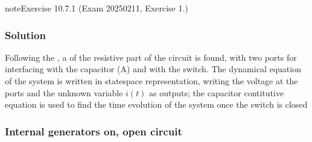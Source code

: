\documentclass[letterpaper,10pt,italian]{jupyterBook}
\begin{document}
\begin{sphinxadmonition}{note}{Exercise 10.7.1 (Exam 2025\sphinxhyphen{}02\sphinxhyphen{}11, Exercise 1.)}



\begin{figure}[htbp]
\centering

\noindent{}
\end{figure}
\subsubsection*{Solution}

\sphinxAtStartPar
Following the , a {\hyperref[\detokenize{ch/electrical-engineering-networks:classical-electromagnetism-electrical-engineering-newtork-analysis-thevenin-n-port}]{}} of the resistive part of the circuit is found, with two ports for interfacing with the capacitor (A) and with the switch. The dynamical equation of the system is written in state\sphinxhyphen{}space representation, writing the voltage at the ports and the unknown variable \(i(t)\) as outputs; the capacitor contitutive equation is used to find the time evolution of the system once the switch is closed

\begin{figure}[htbp]
\centering

\noindent{}
\end{figure}
\subsubsection*{Internal generators on, open circuit}


\end{sphinxadmonition}
\end{document}
